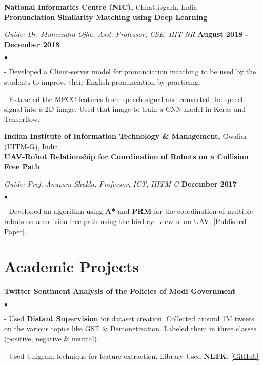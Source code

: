 \documentclass[margin,line]{res}
\newenvironment{list2}{
  \begin{list}{$\bullet$}{%
      \setlength{\itemsep}{0in}
      \setlength{\parsep}{0in} \setlength{\parskip}{0in}
      \setlength{\topsep}{0in} \setlength{\partopsep}{0in} 
      \setlength{\leftmargin}{0.2in}}}{\end{list}}
\begin{document}
\begin{resume}
\vspace{-0.1in}

{\bf National Informatics Centre (NIC),} Chhattisgarh, India\\
{\bf Pronunciation Similarity Matching using Deep Learning}

\vspace{-.3cm}
{\em Guide: Dr. Muneendra Ojha, Asst. Professor, CSE, IIIT-NR} \hfill {\bf August 2018 - December 2018}\\
\vspace*{-.4cm}
\begin{list2}
\item[-] Developed a Client-server model for pronunciation matching to be used by the students to improve their English pronunciation by practicing.
\item[-] Extracted the MFCC features from speech signal and converted the speech signal into a 2D image. Used that image to train a CNN model in Keras and Tensorflow.
\end{list2}

\vspace{-.1cm}
{\bf Indian Institute of Information Technology \& Management,} Gwalior (IIITM-G), India\\
{\bf UAV-Robot Relationship for Coordination of Robots on a Collision Free Path}

\vspace{-.3cm}
{\em Guide: Prof. Anupam Shukla, Professor, ICT, IIITM-G} \hfill {\bf December 2017}\\
\vspace*{-.4cm}
\begin{list2}
\item[-] Developed an algorithm using {\bf A*} and {\bf PRM} for the coordination of multiple robots on a collision free path using the bird eye view of an UAV. \textcolor{blue}{\href{https://doi.org/10.1016/j.procs.2018.07.052}{[Published Paper]}}.
\end{list2}

\vspace{-.1in}
\section{\sc Academic Projects}


{\bf Twitter Sentiment Analysis of the Policies of Modi Government}
\begin{list2}
\item[-] Used {\bf Distant Supervision} for dataset creation. Collected around 1M tweets on the various topics like GST \& Demonetization. Labeled them in three classes (positive, negative \& neutral).
\item[-] Used Unigram technique for feature extraction. Library Used {\bf NLTK}.
\textcolor{blue}{\href{https://github.com/panditu2015/Sentiment-Analysis}{[GitHub]}}
\end{list2}


\end{resume}
\end{document}
